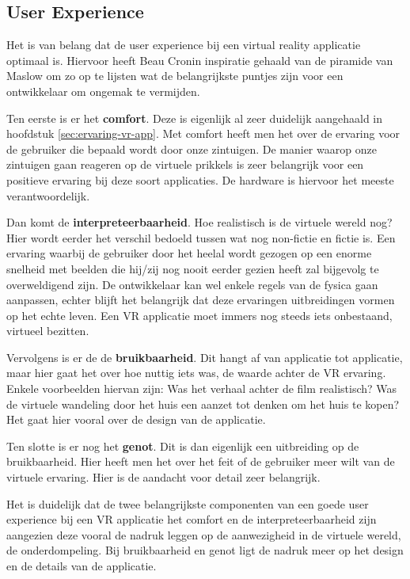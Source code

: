 \subsection{User Experience}
\label{subsec:user-experience}
Het is van belang dat de user experience bij een virtual reality applicatie optimaal is. Hiervoor heeft Beau Cronin \autocite{Cronin2015} inspiratie gehaald van de piramide van Maslow om zo op te lijsten wat de belangrijkste puntjes zijn voor een ontwikkelaar om ongemak te vermijden.

Ten eerste is er het \textbf{comfort}. Deze is eigenlijk al zeer duidelijk aangehaald in hoofdstuk \ref{sec:ervaring-vr-app}. Met comfort heeft men het over de ervaring voor de gebruiker die bepaald wordt door onze zintuigen. De manier waarop onze zintuigen gaan reageren op de virtuele prikkels is zeer belangrijk voor een positieve ervaring bij deze soort applicaties. De hardware is hiervoor het meeste verantwoordelijk.

Dan komt de \textbf{interpreteerbaarheid}. Hoe realistisch is de virtuele wereld nog? Hier wordt eerder het verschil bedoeld tussen wat nog non-fictie en fictie is. Een ervaring waarbij de gebruiker door het heelal wordt gezogen op een enorme snelheid met beelden die hij/zij nog nooit eerder gezien heeft zal bijgevolg te overweldigend zijn. De ontwikkelaar kan wel enkele regels van de fysica gaan aanpassen, echter blijft het belangrijk dat deze ervaringen uitbreidingen vormen op het echte leven. Een VR applicatie moet immers nog steeds iets onbestaand, virtueel bezitten.

Vervolgens is er de de \textbf{bruikbaarheid}. Dit hangt af van applicatie tot applicatie, maar hier gaat het over hoe nuttig iets was, de waarde achter de VR ervaring. Enkele voorbeelden hiervan zijn: Was het verhaal achter de film realistisch? Was de virtuele wandeling door het huis een aanzet tot denken om het huis te kopen? Het gaat hier vooral over de design van de applicatie.

Ten slotte is er nog het \textbf{genot}. Dit is dan eigenlijk een uitbreiding op de bruikbaarheid. Hier heeft men het over het feit of de gebruiker meer wilt van de virtuele ervaring. Hier is de aandacht voor detail zeer belangrijk.

Het is duidelijk dat de twee belangrijkste componenten van een goede user experience bij een VR applicatie het comfort en de interpreteerbaarheid zijn aangezien deze vooral de nadruk leggen op de aanwezigheid in de virtuele wereld, de onderdompeling. Bij bruikbaarheid en genot ligt de nadruk meer op het design en de details van de applicatie.

